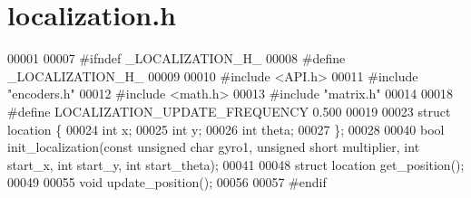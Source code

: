 \section{localization.\+h}
\label{localization_8h_source}

\begin{DoxyCode}
00001 
00007 \textcolor{preprocessor}{#ifndef \_LOCALIZATION\_H\_}
00008 \textcolor{preprocessor}{#define \_LOCALIZATION\_H\_}
00009 
00010 \textcolor{preprocessor}{#include <API.h>}
00011 \textcolor{preprocessor}{#include "encoders.h"}
00012 \textcolor{preprocessor}{#include <math.h>}
00013 \textcolor{preprocessor}{#include "matrix.h"}
00014 
00018 \textcolor{preprocessor}{#define LOCALIZATION\_UPDATE\_FREQUENCY 0.500}
00019 
00023 \textcolor{keyword}{struct }location \{
00024   \textcolor{keywordtype}{int} x;
00025   \textcolor{keywordtype}{int} y;
00026   \textcolor{keywordtype}{int} theta;
00027 \};
00028 
00040 \textcolor{keywordtype}{bool} init_localization(\textcolor{keyword}{const} \textcolor{keywordtype}{unsigned} \textcolor{keywordtype}{char} gyro1, \textcolor{keywordtype}{unsigned} \textcolor{keywordtype}{short} multiplier, \textcolor{keywordtype}{int} start\_x, \textcolor{keywordtype}{int} start\_y, \textcolor{keywordtype}{int} 
      start\_theta);
00041 
00048 \textcolor{keyword}{struct }location get_position();
00049 
00055 \textcolor{keywordtype}{void} update_position();
00056 
00057 \textcolor{preprocessor}{#endif}
\end{DoxyCode}
